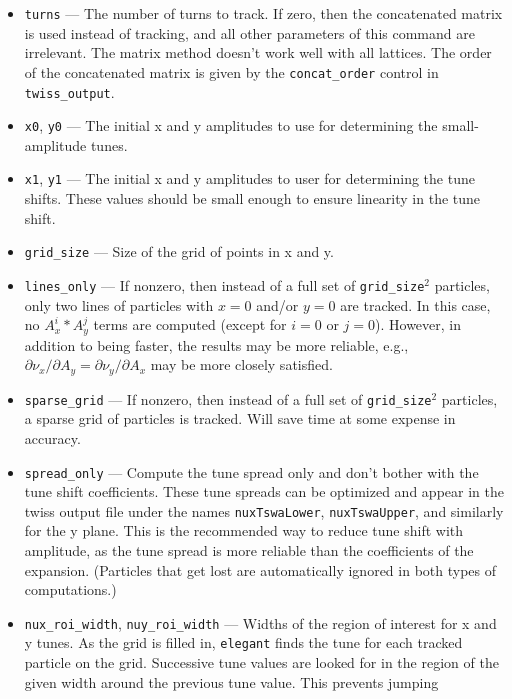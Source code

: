 \documentclass[11pt]{article}
\begin{document}
\begin{itemize}
\item \verb|turns| --- The number of turns to track.  If zero, then the concatenated matrix
        is used instead of tracking, and all other parameters of this command are irrelevant.  
        The matrix method doesn't work well with all lattices.  The order
        of the concatenated matrix is given by the \verb|concat_order| control in 
        \verb|twiss_output|.
\item \verb|x0|, \verb|y0| --- The initial x and y amplitudes to use for determining the
        small-amplitude tunes.
\item \verb|x1|, \verb|y1| --- The initial x and y amplitudes to user for determining the
        tune shifts.  These values should be small enough to ensure linearity in the tune
        shift.  
\item \verb|grid_size| --- Size of the grid of points in x and y.  
\item \verb|lines_only| --- If nonzero, then instead of a full set of \verb|grid_size|$^2$
  particles, only two lines of particles with $x=0$ and/or $y=0$ are tracked.  In this
  case, no $A_x^i*A_y^j$ terms are computed (except for $i=0$ or $j=0$).  However, in addition
  to being faster, the results may be more reliable, e.g., $\partial \nu_x/\partial A_y = 
  \partial \nu_y/\partial A_x$ may be more closely satisfied.
\item \verb|sparse_grid| --- If nonzero, then instead of a full set of \verb|grid_size|$^2$
        particles, a sparse grid of particles is tracked.  Will save time at some expense
        in accuracy.
\item \verb|spread_only| --- Compute the tune spread only and don't bother with the
        tune shift coefficients.  These tune spreads can be optimized and appear in the
        twiss output file under the names \verb|nuxTswaLower|, \verb|nuxTswaUpper|, and
        similarly for the y plane.  This is the recommended way to reduce tune shift
        with amplitude, as the tune spread is more reliable than the coefficients of 
        the expansion.  (Particles that get lost are automatically ignored in both
        types of computations.)
\item \verb|nux_roi_width|, \verb|nuy_roi_width| --- Widths of the region of interest for
        x and y tunes.  As the grid is filled in, {\tt elegant} finds the tune for each
        tracked particle on the grid.  Successive tune values are looked for in the
        region of the given width around the previous tune value.  This prevents jumping

\end{itemize}
\end{document}
